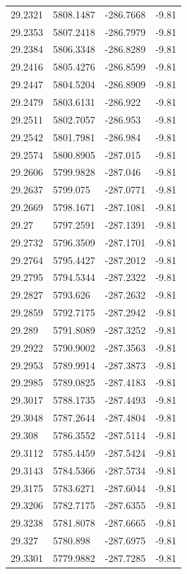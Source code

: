 \begin{table}[H]
\begin{tabular}{llll}
29.2321 & 5808.1487 & -286.7668 & -9.81 \\
29.2353 & 5807.2418 & -286.7979 & -9.81 \\
29.2384 & 5806.3348 & -286.8289 & -9.81 \\
29.2416 & 5805.4276 & -286.8599 & -9.81 \\
29.2447 & 5804.5204 & -286.8909 & -9.81 \\
29.2479 & 5803.6131 & -286.922 & -9.81 \\
29.2511 & 5802.7057 & -286.953 & -9.81 \\
29.2542 & 5801.7981 & -286.984 & -9.81 \\
29.2574 & 5800.8905 & -287.015 & -9.81 \\
29.2606 & 5799.9828 & -287.046 & -9.81 \\
29.2637 & 5799.075 & -287.0771 & -9.81 \\
29.2669 & 5798.1671 & -287.1081 & -9.81 \\
29.27 & 5797.2591 & -287.1391 & -9.81 \\
29.2732 & 5796.3509 & -287.1701 & -9.81 \\
29.2764 & 5795.4427 & -287.2012 & -9.81 \\
29.2795 & 5794.5344 & -287.2322 & -9.81 \\
29.2827 & 5793.626 & -287.2632 & -9.81 \\
29.2859 & 5792.7175 & -287.2942 & -9.81 \\
29.289 & 5791.8089 & -287.3252 & -9.81 \\
29.2922 & 5790.9002 & -287.3563 & -9.81 \\
29.2953 & 5789.9914 & -287.3873 & -9.81 \\
29.2985 & 5789.0825 & -287.4183 & -9.81 \\
29.3017 & 5788.1735 & -287.4493 & -9.81 \\
29.3048 & 5787.2644 & -287.4804 & -9.81 \\
29.308 & 5786.3552 & -287.5114 & -9.81 \\
29.3112 & 5785.4459 & -287.5424 & -9.81 \\
29.3143 & 5784.5366 & -287.5734 & -9.81 \\
29.3175 & 5783.6271 & -287.6044 & -9.81 \\
29.3206 & 5782.7175 & -287.6355 & -9.81 \\
29.3238 & 5781.8078 & -287.6665 & -9.81 \\
29.327 & 5780.898 & -287.6975 & -9.81 \\
29.3301 & 5779.9882 & -287.7285 & -9.81 \\

\end{tabular}
\end{table}
